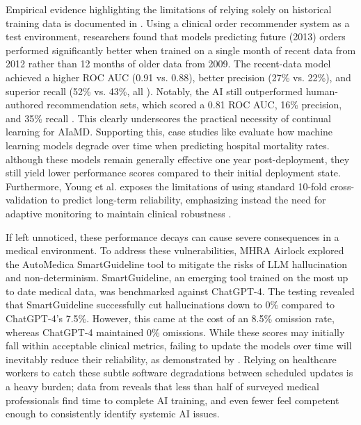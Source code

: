 \documentclass[11pt,a4paper]{article}
\begin{document}
Empirical evidence highlighting the limitations of relying solely on historical training data is documented in \cite{chen2017decaying} . Using a clinical order recommender system as a test environment, researchers found that models predicting future (2013) orders performed significantly better when trained on a single month of recent data from 2012 rather than 12 months of older data from 2009. The recent-data model achieved a higher ROC AUC (0.91 vs. 0.88), better precision (27\% vs. 22\%), and superior recall (52\% vs. 43\%, all ). Notably, the AI still outperformed human-authored recommendation sets, which scored a 0.81 ROC AUC, 16\% precision, and 35\% recall \cite{chen2017decaying} . This clearly underscores the practical necessity of continual learning for AIaMD. Supporting this, case studies like \cite{young2022empirical} evaluate how machine learning models degrade over time when predicting hospital mortality rates. although these models remain generally effective one year post-deployment, they still yield lower performance scores compared to their initial deployment state. Furthermore, Young et al. \cite{young2022empirical} exposes the limitations of using standard 10-fold cross-validation to predict long-term reliability, emphasizing instead the need for adaptive monitoring to maintain clinical robustness \cite{guan2026} .

If left unnoticed, these performance decays can cause severe consequences in a medical environment. To address these vulnerabilities, MHRA Airlock \cite{mhra2025} explored the AutoMedica SmartGuideline tool to mitigate the risks of LLM hallucination and non-determinism. SmartGuideline, an emerging tool trained on the most up to date medical data, was benchmarked against ChatGPT-4. The testing revealed that SmartGuideline successfully cut hallucinations down to 0\% compared to ChatGPT-4's 7.5\%. However, this came at the cost of an 8.5\% omission rate, whereas ChatGPT-4 maintained 0\% omissions. While these scores may initially fall within acceptable clinical metrics, failing to update the models over time will inevitably reduce their reliability, as demonstrated by \cite{chen2017decaying} \cite{young2022empirical} . Relying on healthcare workers to catch these subtle software degradations between scheduled updates is a heavy burden; data from \cite{vention2026UKhealthcare} reveals that less than half of surveyed medical professionals find time to complete AI training, and even fewer feel competent enough to consistently identify systemic AI issues. 
\end{document}

